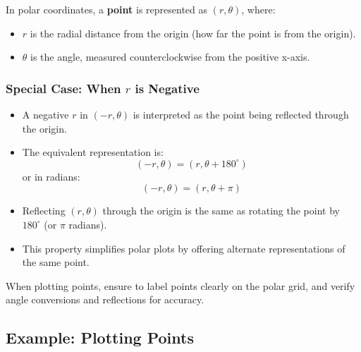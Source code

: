 \documentclass{article}
\begin{document}
\begin{conceptbox}
In polar coordinates, a \textbf{point} is represented as \( (r, \theta) \), where:
\begin{itemize}
    \item \( r \) is the radial distance from the origin (how far the point is from the origin).
    \item \( \theta \) is the angle, measured counterclockwise from the positive x-axis.
\end{itemize}

\begin{notebox}
    \subsubsection*{Special Case: When \( r \) is Negative}
    \begin{itemize}
        \item A negative \( r \) in \( (-r, \theta) \) is interpreted as the point being reflected through the origin.
        \item The equivalent representation is:
        \[
        (-r, \theta) = (r, \theta + 180^\circ)
        \]
        or in radians:
        \[
        (-r, \theta) = (r, \theta + \pi)
        \]
    \end{itemize}
\end{notebox}

\begin{intuitionbox}
    \begin{itemize}
        \item Reflecting \( (r, \theta) \) through the origin is the same as rotating the point by \( 180^\circ \) (or \( \pi \) radians).
        \item This property simplifies polar plots by offering alternate representations of the same point.
    \end{itemize}
\end{intuitionbox}
\end{conceptbox}

\begin{tipbox}
    When plotting points, ensure to label points clearly on the polar grid, and verify angle conversions and reflections for accuracy.
\end{tipbox}

\subsection*{Example: Plotting Points}
\end{document}

